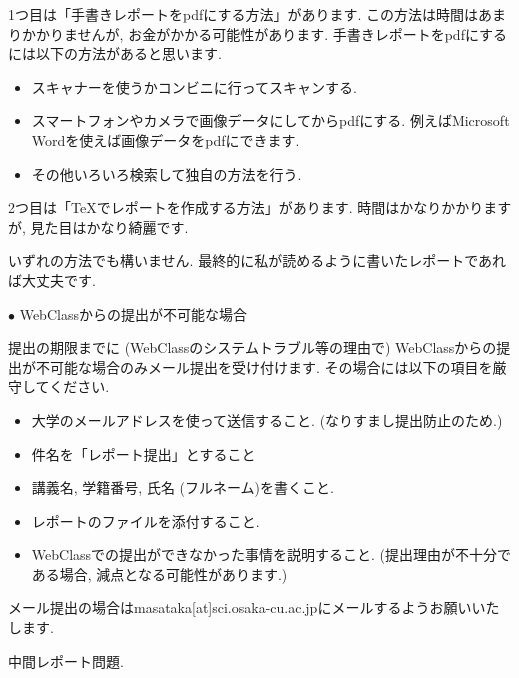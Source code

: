 \documentclass[dvipdfmx,a4paper,11pt]{article}
\theoremstyle{definition}
\begin{document}
1つ目は「手書きレポートをpdfにする方法」があります.
この方法は時間はあまりかかりませんが, お金がかかる可能性があります.
手書きレポートをpdfにするには以下の方法があると思います.
\begin{itemize}
\setlength{\parskip}{0cm} %
  \setlength{\itemsep}{0cm}
\item スキャナーを使うかコンビニに行ってスキャンする.
\item スマートフォンやカメラで画像データにしてからpdfにする. 例えばMicrosoft Wordを使えば画像データをpdfにできます. %
\item その他いろいろ検索して独自の方法を行う.
\end{itemize}

2つ目は「TeXでレポートを作成する方法」があります.
時間はかなりかかりますが, 見た目はかなり綺麗です.
\vspace{11pt}


いずれの方法でも構いません. 最終的に私が読めるように書いたレポートであれば大丈夫です.

\vspace{11pt}
 \hspace{-11pt}
{\Large $\bullet$ WebClassからの提出が不可能な場合}
\vspace{11pt}

提出の期限までに (WebClassのシステムトラブル等の理由で) WebClassからの提出が不可能な場合のみメール提出を受け付けます.
その場合には以下の項目を厳守してください.
\begin{itemize}
\setlength{\parskip}{0cm} %
  \setlength{\itemsep}{0cm}
\item 大学のメールアドレスを使って送信すること. (なりすまし提出防止のため.)
\item 件名を「レポート提出」とすること
\item 講義名, 学籍番号, 氏名 (フルネーム)を書くこと.
\item レポートのファイルを添付すること.
\item WebClassでの提出ができなかった事情を説明すること. (提出理由が不十分である場合, 減点となる可能性があります.)
\end{itemize}

メール提出の場合はmasataka[at]sci.osaka-cu.ac.jpにメールするようお願いいたします.

\newpage
\begin{center}
{\LARGE 中間レポート問題.} 
\end{center}
\end{document}
